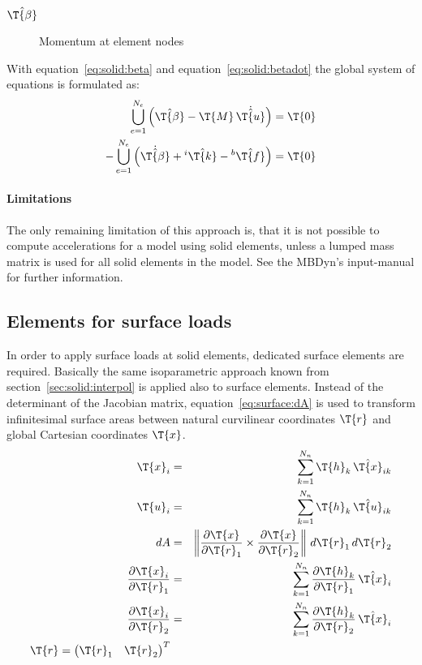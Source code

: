 \begin{description}
\item[$\hat{\T{\beta}}$] Momentum at element nodes
\end{description}

With equation~\ref{eq:solid:beta} and equation~\ref{eq:solid:betadot} the global system of equations is formulated as:
\begin{eqnarray}
\bigcup_{e=1}^{N_e} \left(\hat{\T{\beta}} - \T{M} \, \dot{\hat{\T{u}}}\right) = \T{0} \\
-\bigcup_{e=1}^{N_e} \left(\dot{\hat{\T{\beta}}} + {^i}\hat{\T{k}} - {^b}\hat{\T{f}} \right) = \T{0}
\end{eqnarray}

\paragraph{Limitations}
The only remaining limitation of this approach is, that it is not possible to compute accelerations
for a model using solid elements, unless a lumped mass matrix is used for all solid elements in the model.
See the MBDyn's input-manual for further information.

\subsection{Elements for surface loads}
In order to apply surface loads at solid elements, dedicated surface elements are required.
Basically the same isoparametric approach known from section~\ref{sec:solid:interpol} is applied also to surface elements.
Instead of the determinant of the Jacobian matrix, equation~\ref{eq:surface:dA} is used to transform infinitesimal surface areas
between natural curvilinear coordinates $\T{r}$ and global Cartesian coordinates $\T{x}$.
\begin{eqnarray}
\T{x}_i & = & \sum_{k=1}^{N_n} \T{h}_k \, \hat{\T{x}}_{ik} \\
\T{u}_i & = & \sum_{k=1}^{N_n} \T{h}_k \, \hat{\T{u}}_{ik} \\
dA & = & \left\Vert\frac{\partial \T{x}}{\partial \T{r}_1} \times \frac{\partial \T{x}}{\partial \T{r}_2} \right\Vert \,d\T{r}_1 \, d\T{r}_2 \label{eq:surface:dA} \\
\frac{\partial \T{x}_i}{\partial \T{r}_1} & = &\sum_{k=1}^{N_n} \frac{\partial \T{h}_{k}}{\partial \T{r}_1} \, \hat{\T{x}}_i \\
\frac{\partial \T{x}_i}{\partial \T{r}_2} & = &\sum_{k=1}^{N_n} \frac{\partial \T{h}_{k}}{\partial \T{r}_2} \, \hat{\T{x}}_i \\
\T{r}=\begin{pmatrix} \T{r}_1 & \T{r}_2 \end{pmatrix}^T
\end{eqnarray}
